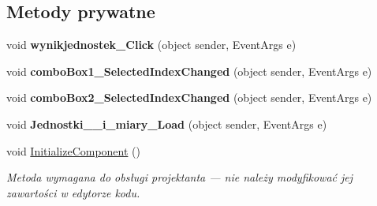 \subsection*{Metody prywatne}
\begin{DoxyCompactItemize}
\item 
\mbox{\label{classkalku__all__in__one_1_1_jednostki____i__miary_a6ac0ec42b520059ca22861357e73e987}} 
void {\bfseries wynikjednostek\+\_\+\+Click} (object sender, Event\+Args e)
\item 
\mbox{\label{classkalku__all__in__one_1_1_jednostki____i__miary_a0e4ef500a4986d1a6a40553981b117b4}} 
void {\bfseries combo\+Box1\+\_\+\+Selected\+Index\+Changed} (object sender, Event\+Args e)
\item 
\mbox{\label{classkalku__all__in__one_1_1_jednostki____i__miary_ac49bd1ac283ae5eef207b6fb837f140b}} 
void {\bfseries combo\+Box2\+\_\+\+Selected\+Index\+Changed} (object sender, Event\+Args e)
\item 
\mbox{\label{classkalku__all__in__one_1_1_jednostki____i__miary_a70166d82bbb72fc08b325beed249ab37}} 
void {\bfseries Jednostki\+\_\+\+\_\+i\+\_\+miary\+\_\+\+Load} (object sender, Event\+Args e)
\item 
void \mbox{\hyperlink{classkalku__all__in__one_1_1_jednostki____i__miary_a1d42f7bc7cd880252b7d32adde5633d7}{Initialize\+Component}} ()
\begin{DoxyCompactList}\small\item\em Metoda wymagana do obsługi projektanta — nie należy modyfikować jej zawartości w edytorze kodu. \end{DoxyCompactList}\end{DoxyCompactItemize}

